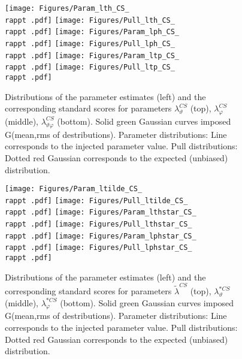 \documentclass[12pt]{article}
\newcommand{\lamthCS}{\lambda^{\scriptscriptstyle CS}_\vartheta}
\newcommand{\lamphCS}{\lambda^{\scriptscriptstyle CS}_\varphi}
\newcommand{\lamthphCS}{\lambda^{\scriptscriptstyle CS}_{\vartheta \varphi}}
\newcommand{\lamtildeCS}{\tilde{\lambda}^{\scriptscriptstyle CS}}
\newcommand{\lamthstarCS}{\lambda^{* \scriptscriptstyle CS}_\vartheta}
\newcommand{\lamphstarCS}{\lambda^{* \scriptscriptstyle CS}_\varphi}
\providecommand{\rappt}[1]{rap1pt1}%
\begin{document}




\begin{figure}[htbp]
\centering
\texttt{[image: Figures/Param\_lth\_CS\_\\rappt .pdf]}
\texttt{[image: Figures/Pull\_lth\_CS\_\\rappt .pdf]}
\texttt{[image: Figures/Param\_lph\_CS\_\\rappt .pdf]}
\texttt{[image: Figures/Pull\_lph\_CS\_\\rappt .pdf]}
\texttt{[image: Figures/Param\_ltp\_CS\_\\rappt .pdf]}
\texttt{[image: Figures/Pull\_ltp\_CS\_\\rappt .pdf]}
\caption{Distributions of the parameter estimates (left) and the corresponding
standard scores for parameters $\lamthCS$ (top), $\lamphCS$ (middle),
$\lamthphCS$ (bottom). Solid green Gaussian curves imposed G(mean,rms of
destributions). Parameter distributions: Line corresponds to the injected parameter value.
Pull distributions: Dotted red Gaussian corresponds to the expected
(unbiased) distribution.}
\end{figure}
\clearpage

\begin{figure}[htbp]
\centering
\texttt{[image: Figures/Param\_ltilde\_CS\_\\rappt .pdf]}
\texttt{[image: Figures/Pull\_ltilde\_CS\_\\rappt .pdf]}
\texttt{[image: Figures/Param\_lthstar\_CS\_\\rappt .pdf]}
\texttt{[image: Figures/Pull\_lthstar\_CS\_\\rappt .pdf]}
\texttt{[image: Figures/Param\_lphstar\_CS\_\\rappt .pdf]}
\texttt{[image: Figures/Pull\_lphstar\_CS\_\\rappt .pdf]}
\caption{Distributions of the parameter estimates (left) and the corresponding
standard scores for parameters $\lamtildeCS$ (top), $\lamthstarCS$ (middle),
$\lamphstarCS$ (bottom). Solid green Gaussian curves imposed G(mean,rms of
destributions). Parameter distributions: Line corresponds to the injected parameter value.
Pull distributions: Dotted red Gaussian corresponds to the expected
(unbiased) distribution.}
\end{figure}
\clearpage





\end{document}
